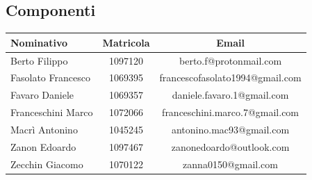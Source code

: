 \documentclass[../PianoProgetto.tex]{subfiles}
\begin{document}
\vfill
	
	\subsection{Componenti}
		\begin{table}[h]
	
		\begin{tabularx}{\textwidth}{lc C}
			\toprule
			\textbf{Nominativo} & \textbf{Matricola} & \textbf{Email} \\
			\midrule
			Berto Filippo & 1097120 & berto.f@protonmail.com \\
			Fasolato Francesco & 1069395 & francescofasolato1994@gmail.com  \\
			Favaro Daniele	& 1069357 & daniele.favaro.1@gmail.com\\
			Franceschini Marco & 1072066 & franceschini.marco.7@gmail.com\\
			Macrì Antonino & 1045245 & antonino.mac93@gmail.com\\
			Zanon Edoardo & 1097467 & zanonedoardo@outlook.com	 \\
			Zecchin Giacomo & 1070122 & zanna0150@gmail.com \\
			\bottomrule
		\end{tabularx}
		
		\end{table}		
\vfill			
\end{document}

